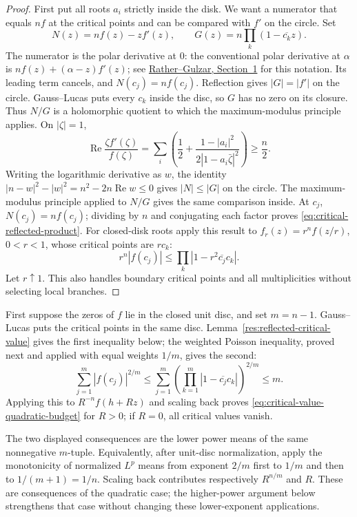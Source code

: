 \begin{proof}
First put all roots $a_i$ strictly inside the disk. We want a numerator
that equals $nf$ at the critical points and can be compared with $f'$
on the circle. Set
\[
 N(z)=nf(z)-zf'(z),\qquad
 G(z)=n\prod_k(1-\overline{c_k}z).
\]
The numerator is the polar derivative at $0$: the conventional polar
derivative at $\alpha$ is $nf(z)+(\alpha-z)f'(z)$; see
\href{https://arxiv.org/abs/1303.0068v1}{Rather--Gulzar, Section~1} for this
notation. Its leading term cancels, and $N(c_j)=nf(c_j)$.
Reflection gives $|G|=|f'|$ on the circle. Gauss--Lucas puts every
$c_k$ inside the disc, so $G$ has no zero on its closure. Thus $N/G$
is a holomorphic quotient to which the maximum-modulus principle applies.  On $|\zeta|=1$,
\[
 \operatorname{Re}\frac{\zeta f'(\zeta)}{f(\zeta)}
 =\sum_i\left(\frac12+
       \frac{1-|a_i|^2}{2|1-a_i\bar\zeta|^2}\right)\ge\frac n2.
\]
Writing the logarithmic derivative as $w$, the identity
$|n-w|^2-|w|^2=n^2-2n\operatorname{Re}w\le0$ gives
$|N|\le|G|$ on the circle.  The maximum-modulus principle applied to
$N/G$ gives the same comparison inside.  At $c_j$, $N(c_j)=nf(c_j)$;
dividing by $n$ and conjugating each factor proves
\eqref{eq:critical-reflected-product}.
For closed-disk roots apply this result to
$f_r(z)=r^nf(z/r)$, $0<r<1$, whose critical points are $rc_k$:
\[
 r^n|f(c_j)|\le\prod_k|1-r^2\overline{c_j}c_k|.
\]
Let $r\uparrow1$.  This also handles boundary critical points and all
multiplicities without selecting local branches.
\end{proof}

First suppose the zeros of $f$ lie in the closed unit disc, and set
$m=n-1$. Gauss--Lucas puts the critical points in the same disc.
Lemma~\ref{res:reflected-critical-value} gives the first inequality below;
the weighted Poisson inequality, proved next and applied with equal
weights $1/m$, gives the second:
\[
 \sum_{j=1}^m|f(c_j)|^{2/m}
 \le\sum_{j=1}^m\left(\prod_{k=1}^m
             |1-\overline{c_j}c_k|\right)^{2/m}\le m.
\]  Applying this to
$R^{-n}f(h+Rz)$ and scaling back proves
\eqref{eq:critical-value-quadratic-budget} for $R>0$; if $R=0$, all critical
values vanish.

The two displayed consequences are the lower power means of the same
nonnegative $m$-tuple.  Equivalently, after unit-disc normalization, apply
the monotonicity of normalized $L^p$ means from exponent $2/m$ first to
$1/m$ and then to $1/(m+1)=1/n$.  Scaling back contributes respectively
$R^{n/m}$ and $R$. These are consequences of the quadratic case;
the higher-power argument below strengthens that case without changing
these lower-exponent applications.

